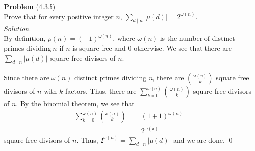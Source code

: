 \documentclass[12 pt]{amsart}
\begin{document}
\phantom{\quad} \vfill
\noindent
\textbf{Problem} (4.3.5) \\[4ex]
  Prove that for every positive integer $n$,
  $\sum_{d \mid n} |\mu(d)| = 2^{\omega(n)}$.
  \\[2ex]
\emph{Solution.} \\[2ex]
  By definition, $\mu(n) = (-1)^{\omega(n)}$, where
  $\omega(n)$ is the number of distinct primes dividing $n$
  if $n$ is square free and 0 otherwise.
  We see that there are 
  $\sum_{d \mid n} |\mu(d)|$
  square free divisors of $n$.

  Since there are $\omega(n)$ distinct primes dividing $n$,
  there are $\binom{\omega(n)}{k}$ square free divisors of $n$ 
  with $k$ factors.
  Thus, there are 
  $\sum_{k = 0}^{\omega(n)} \binom{\omega(n)}{k}$ square free divisors
  of $n$.
  By the binomial theorem, we see that 
  \begin{align*}
    \sum_{k = 0}^{\omega(n)} \binom{\omega(n)}{k} &= (1 + 1)^{\omega(n)} \\
                                                  &= 2^{\omega(n)}
  \end{align*}
  square free divisors of $n$.
  Thus, $2^{\omega(n)} = \sum_{d \mid n} |\mu(d)|$ and we are done.
  \qed
\vfill
\end{document}
